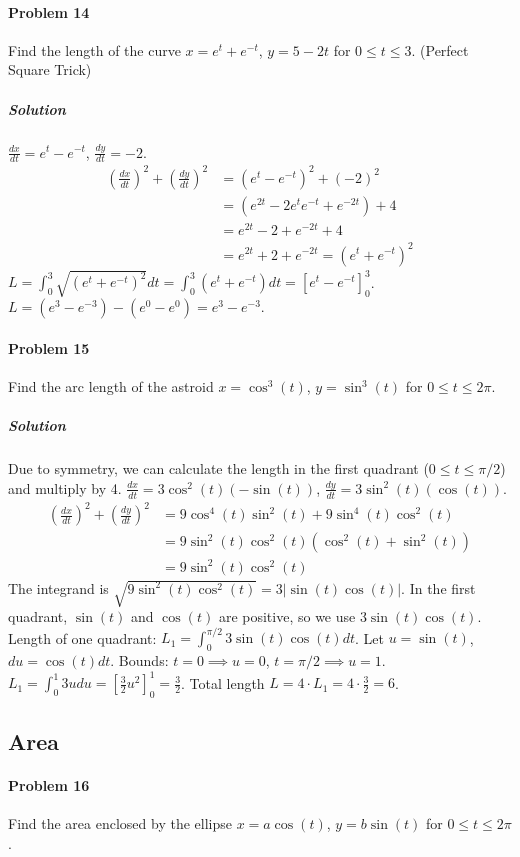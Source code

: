 \documentclass{article}
\begin{document}
\paragraph{Problem 14}
Find the length of the curve $x = e^t + e^{-t}$, $y = 5 - 2t$ for $0 \le t \le 3$. (Perfect Square Trick)

\subparagraph{Solution}
$\frac{dx}{dt} = e^t - e^{-t}$, $\frac{dy}{dt} = -2$.
\begin{align*}
(\frac{dx}{dt})^2 + (\frac{dy}{dt})^2 &= (e^t - e^{-t})^2 + (-2)^2 \\
&= (e^{2t} - 2e^t e^{-t} + e^{-2t}) + 4 \\
&= e^{2t} - 2 + e^{-2t} + 4 \\
&= e^{2t} + 2 + e^{-2t} = (e^t + e^{-t})^2
\end{align*}
$L = \int_0^3 \sqrt{(e^t + e^{-t})^2} dt = \int_0^3 (e^t + e^{-t}) dt = [e^t - e^{-t}]_0^3$.
$L = (e^3 - e^{-3}) - (e^0 - e^0) = e^3 - e^{-3}$.

\paragraph{Problem 15}
Find the arc length of the astroid $x = \cos^3(t)$, $y = \sin^3(t)$ for $0 \le t \le 2\pi$.

\subparagraph{Solution}
Due to symmetry, we can calculate the length in the first quadrant ($0 \le t \le \pi/2$) and multiply by 4.
$\frac{dx}{dt} = 3\cos^2(t)(-\sin(t))$, $\frac{dy}{dt} = 3\sin^2(t)(\cos(t))$.
\begin{align*}
(\frac{dx}{dt})^2 + (\frac{dy}{dt})^2 &= 9\cos^4(t)\sin^2(t) + 9\sin^4(t)\cos^2(t) \\
&= 9\sin^2(t)\cos^2(t)(\cos^2(t) + \sin^2(t)) \\
&= 9\sin^2(t)\cos^2(t)
\end{align*}
The integrand is $\sqrt{9\sin^2(t)\cos^2(t)} = 3|\sin(t)\cos(t)|$.
In the first quadrant, $\sin(t)$ and $\cos(t)$ are positive, so we use $3\sin(t)\cos(t)$.
Length of one quadrant: $L_1 = \int_0^{\pi/2} 3\sin(t)\cos(t) dt$.
Let $u=\sin(t)$, $du=\cos(t)dt$. Bounds: $t=0 \implies u=0$, $t=\pi/2 \implies u=1$.
$L_1 = \int_0^1 3u du = \left[ \frac{3}{2}u^2 \right]_0^1 = \frac{3}{2}$.
Total length $L = 4 \cdot L_1 = 4 \cdot \frac{3}{2} = 6$.


\subsection*{Area}

\paragraph{Problem 16}
Find the area enclosed by the ellipse $x=a\cos(t)$, $y=b\sin(t)$ for $0 \le t \le 2\pi$.
\end{document}
